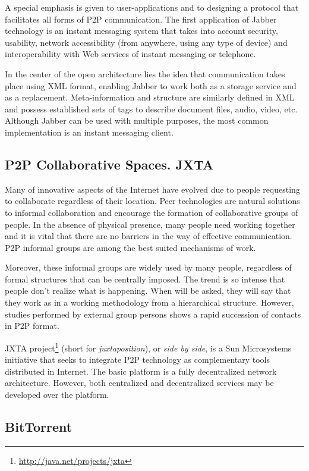 A special emphasis is given to user-applications and to designing a protocol
that facilitates all forms of P2P communication. The first application of Jabber
technology is an instant messaging system that takes into account security,
usability, network accessibility (from anywhere, using any type of device) and
interoperability with Web services of instant messaging or telephone.

In the center of the open architecture lies the idea that communication takes
place using XML format, enabling Jabber to work both as a storage service and
as a replacement. Meta-information and structure are similarly defined in XML
and possess established sets of tags to describe document files, audio, video,
etc. Although Jabber can be used with multiple purposes, the most common
implementation is an instant messaging client.

\subsection{P2P Collaborative Spaces. JXTA}

Many of innovative aspects of the Internet have evolved due to people
requesting to collaborate regardless of their location. Peer
technologies are natural solutions to informal collaboration and encourage
the formation of collaborative groups of people. In the absence of physical
presence, many people need working together and it is vital that there are no
barriers in the way of effective communication. P2P informal groups are among
the best suited mechanisms of work.

Moreover, these informal groups are widely used by many people, regardless of
formal structures that can be centrally imposed. The trend is so intense that
people don't realize what is happening. When will be asked, they will say that
they work as in a working methodology from a hierarchical structure. However,
studies performed by external group persons shows a rapid succession of
contacts in P2P format.

JXTA project\footnote{\url{http://java.net/projects/jxta}} (short for \textit{juxtaposition}), or
\textit{side by side}, is a Sun
Microsystems initiative that seeks to integrate P2P technology as
complementary tools distributed in Internet. The basic platform is a fully
decentralized network architecture. However, both centralized and
decentralized services may be developed over the platform.

\subsection{BitTorrent}


